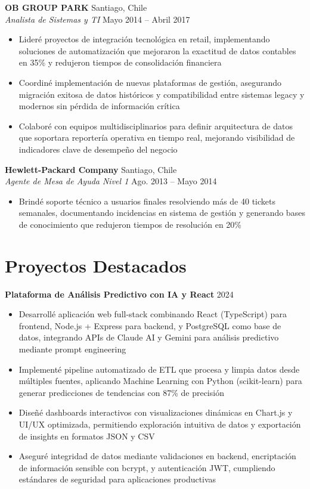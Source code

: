 \documentclass[11pt,letterpaper]{article}
\begin{document}
\vspace{2pt}
\textbf{OB GROUP PARK} \hfill Santiago, Chile\\
\textit{Analista de Sistemas y TI} \hfill Mayo 2014 – Abril 2017
\begin{itemize}
  \item Lideré proyectos de integración tecnológica en retail, implementando soluciones de automatización que mejoraron la exactitud de datos contables en 35\% y redujeron tiempos de consolidación financiera
  \item Coordiné implementación de nuevas plataformas de gestión, asegurando migración exitosa de datos históricos y compatibilidad entre sistemas legacy y modernos sin pérdida de información crítica
  \item Colaboré con equipos multidisciplinarios para definir arquitectura de datos que soportara reportería operativa en tiempo real, mejorando visibilidad de indicadores clave de desempeño del negocio
\end{itemize}
\vspace{2pt}
\textbf{Hewlett-Packard Company} \hfill Santiago, Chile\\
\textit{Agente de Mesa de Ayuda Nivel 1} \hfill Ago. 2013 – Mayo 2014
\begin{itemize}
  \item Brindé soporte técnico a usuarios finales resolviendo más de 40 tickets semanales, documentando incidencias en sistema de gestión y generando bases de conocimiento que redujeron tiempos de resolución en 20\%
\end{itemize}

\section{Proyectos Destacados}

\textbf{Plataforma de Análisis Predictivo con IA y React} \hfill 2024
\begin{itemize}
  \item Desarrollé aplicación web full-stack combinando React (TypeScript) para frontend, Node.js + Express para backend, y PostgreSQL como base de datos, integrando APIs de Claude AI y Gemini para análisis predictivo mediante prompt engineering
  \item Implementé pipeline automatizado de ETL que procesa y limpia datos desde múltiples fuentes, aplicando Machine Learning con Python (scikit-learn) para generar predicciones de tendencias con 87\% de precisión
  \item Diseñé dashboards interactivos con visualizaciones dinámicas en Chart.js y UI/UX optimizada, permitiendo exploración intuitiva de datos y exportación de insights en formatos JSON y CSV
  \item Aseguré integridad de datos mediante validaciones en backend, encriptación de información sensible con bcrypt, y autenticación JWT, cumpliendo estándares de seguridad para aplicaciones productivas
\end{itemize}
\end{document}
